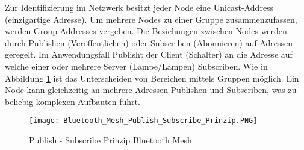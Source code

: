 Zur Identifizierung im Netzwerk besitzt jeder Node eine Unicast-Address (einzigartige Adresse). Um mehrere Nodes zu einer Gruppe zusammenzufassen, werden Group-Addresses vergeben. Die Beziehungen zwischen Nodes werden durch Publishen (Veröffentlichen) oder Subscriben (Abonnieren) auf Adressen geregelt. Im Anwendungsfall Publisht der Client (Schalter) an die Adresse auf welche einer oder mehrere Server (Lampe/Lampen) Subscriben. Wie in Abbildung \ref{fig:BTMeshPublishSubscribePrinzip} ist das Unterscheiden von Bereichen mittels Gruppen möglich. Ein Node kann gleichzeitig an mehrere Adressen Publishen und Subscriben, was zu beliebig komplexen Aufbauten führt. 


\begin{figure} [H]
	\centering
	\texttt{[image: Bluetooth\_Mesh\_Publish\_Subscribe\_Prinzip.PNG]}
	\caption{Publish - Subscribe Prinzip Bluetooth Mesh \cite{bluetooth_sig_mesh-technology-overviewpdf_2020}} 
	\label{fig:BTMeshPublishSubscribePrinzip}
\end{figure}








